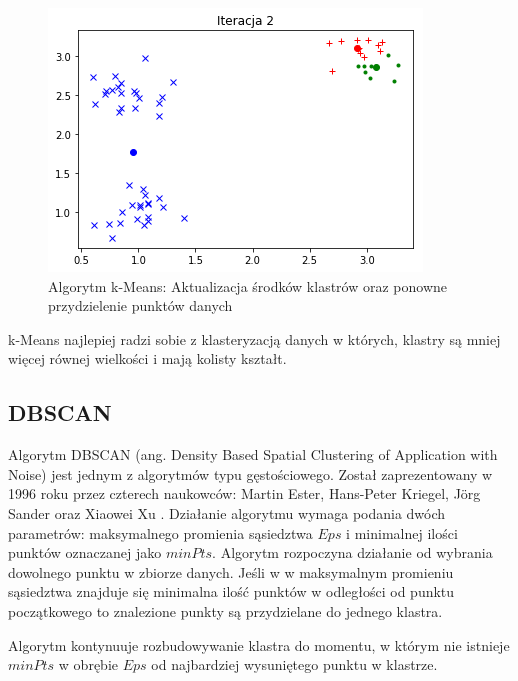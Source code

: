     \begin{figure}[h!]
        \centering
    \includegraphics[width=0.6\linewidth]{Rysunki/Rozdzial2/zlaiteracja2.png}
    \caption{Algorytm k-Means: Aktualizacja środków klastrów oraz ponowne przydzielenie punktów danych}
    \label{fig:kmeans_bad2}
    \end{figure}

    k-Means najlepiej radzi sobie z klasteryzacją danych w których, klastry są mniej więcej równej wielkości i mają kolisty kształt.
    \newpage
    
    \subsection{DBSCAN}
    Algorytm DBSCAN (ang. Density Based Spatial Clustering of Application with Noise) jest jednym z algorytmów typu gęstościowego. Został zaprezentowany w 1996 roku przez czterech naukowców: Martin Ester, Hans-Peter Kriegel, Jörg Sander oraz Xiaowei Xu \cite{dbscan}. Działanie algorytmu wymaga podania dwóch parametrów: maksymalnego promienia sąsiedztwa $Eps$ i minimalnej ilości punktów oznaczanej jako $minPts$. Algorytm rozpoczyna działanie od wybrania dowolnego punktu w zbiorze danych. Jeśli w w maksymalnym promieniu sąsiedztwa znajduje się minimalna ilość punktów w odległości od punktu początkowego to znalezione punkty są przydzielane do jednego klastra. 
    
    Algorytm kontynuuje rozbudowywanie klastra do momentu, w którym nie istnieje $minPts$ w obrębie $Eps$ od najbardziej wysuniętego punktu w klastrze.
    
